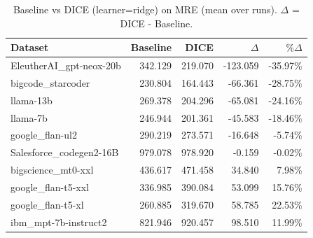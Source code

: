 \begin{table}[t]
\centering
\small
\caption{Baseline vs DICE (learner=ridge) on MRE (mean over runs). $\Delta$ = DICE - Baseline.}
\label{tab:baseline-vs-dice-ridge-MRE}
\begin{tabular}{lrrrr}
\toprule
Dataset & Baseline & DICE & $\Delta$ & $\%\Delta$ \\
\midrule
EleutherAI\_gpt-neox-20b & 342.129 & 219.070 & -123.059 & -35.97\% \\
bigcode\_starcoder & 230.804 & 164.443 & -66.361 & -28.75\% \\
llama-13b & 269.378 & 204.296 & -65.081 & -24.16\% \\
llama-7b & 246.944 & 201.361 & -45.583 & -18.46\% \\
google\_flan-ul2 & 290.219 & 273.571 & -16.648 & -5.74\% \\
Salesforce\_codegen2-16B & 979.078 & 978.920 & -0.159 & -0.02\% \\
bigscience\_mt0-xxl & 436.617 & 471.458 & 34.840 & 7.98\% \\
google\_flan-t5-xxl & 336.985 & 390.084 & 53.099 & 15.76\% \\
google\_flan-t5-xl & 260.885 & 319.670 & 58.785 & 22.53\% \\
ibm\_mpt-7b-instruct2 & 821.946 & 920.457 & 98.510 & 11.99\% \\
\bottomrule
\end{tabular}
\end{table}